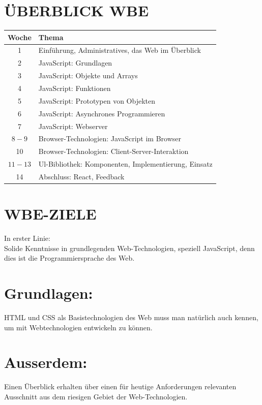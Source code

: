 \section*{ÜBERBLICK WBE}
\begin{center}
\begin{tabular}{|c|l|}
\hline
Woche & Thema \\
\hline
1 & Einführung, Administratives, das Web im Überblick \\
\hline
2 & JavaScript: Grundlagen \\
\hline
3 & JavaScript: Objekte und Arrays \\
\hline
4 & JavaScript: Funktionen \\
\hline
5 & JavaScript: Prototypen von Objekten \\
\hline
6 & JavaScript: Asynchrones Programmieren \\
\hline
7 & JavaScript: Webserver \\
\hline
$8-9$ & Browser-Technologien: JavaScript im Browser \\
\hline
10 & Browser-Technologien: Client-Server-Interaktion \\
\hline
$11-13$ & Ul-Bibliothek: Komponenten, Implementierung, Einsatz \\
\hline
14 & Abschluss: React, Feedback \\
\hline
\end{tabular}
\end{center}

\section*{WBE-ZIELE}
In erster Linie:\\
Solide Kenntnisse in grundlegenden Web-Technologien, speziell JavaScript, denn dies ist die Programmiersprache des Web.

\section*{Grundlagen:}
HTML und CSS als Basistechnologien des Web muss man natürlich auch kennen, um mit Webtechnologien entwickeln zu können.

\section*{Ausserdem:}
Einen Überblick erhalten über einen für heutige Anforderungen relevanten Ausschnitt aus dem riesigen Gebiet der Web-Technologien.

